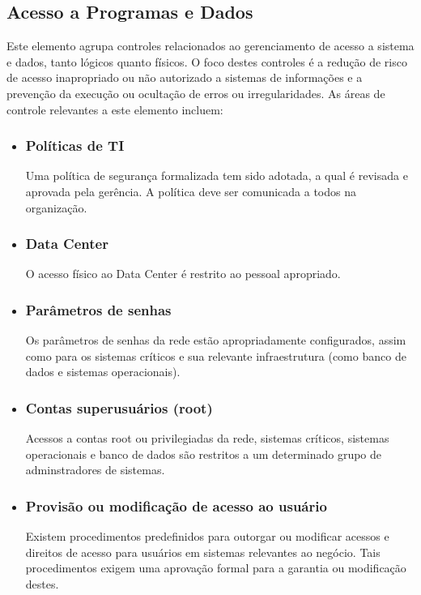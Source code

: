\subsection{Acesso a Programas e Dados}

	Este elemento agrupa controles relacionados ao gerenciamento de acesso a sistema e dados, tanto lógicos quanto físicos. O foco destes controles é a redução de risco de acesso inapropriado ou não autorizado a sistemas de informações e a prevenção da execução ou ocultação de erros ou irregularidades. As áreas de controle relevantes a este elemento incluem:
\begin{itemize}
\item    \subsubsection{Políticas de TI}
	Uma política de segurança formalizada tem sido adotada, a qual é revisada e aprovada pela gerência. A política deve ser comunicada a todos na organização.
\item	\subsubsection{Data Center}
	O acesso físico ao Data Center é restrito ao pessoal apropriado.
\item	\subsubsection{Parâmetros de senhas}
	Os parâmetros de senhas da rede estão apropriadamente configurados, assim como para os sistemas críticos e sua relevante infraestrutura (como banco de dados e sistemas operacionais).
\item	\subsubsection{Contas superusuários (root)}
	Acessos a contas root ou privilegiadas da rede, sistemas críticos, sistemas operacionais e banco de dados são restritos a um determinado grupo de adminstradores de sistemas.
\item	\subsubsection{Provisão ou modificação de acesso ao usuário}
	Existem procedimentos predefinidos para outorgar ou modificar acessos e direitos de acesso para usuários em sistemas relevantes ao negócio. Tais procedimentos exigem uma aprovação formal para a garantia ou modificação destes.

\end{itemize}
